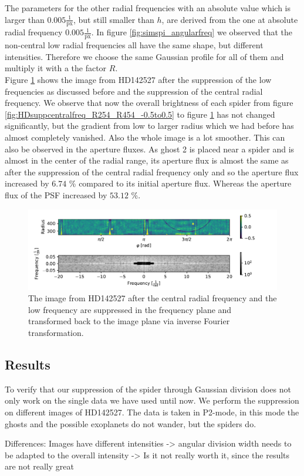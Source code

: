 The parameters for the other radial frequencies with an absolute value which is larger than $0.005 \frac{1}{\mathrm{px}}$, but still smaller than $h$, are derived from the one at absolute radial frequency $0.005 \frac{1}{\mathrm{px}}$. In figure \ref{fig:simspi_angularfreq} we observed that the non-central low radial frequencies all have the same shape, but different intensities. Therefore we choose the same Gaussian profile for all of them and multiply it with a the factor $R$.\\
Figure \ref{fig:HDsupplowfreq_R254_R454_-0.5to0.5.pdf} shows the image from HD142527 after the suppression of the low frequencies as discussed before and the suppression of the central radial frequency. We observe that now the overall brightness of each spider from figure \ref{fig:HDsuppcentralfreq_R254_R454_-0.5to0.5} to figure \ref{fig:HDsupplowfreq_R254_R454_-0.5to0.5.pdf} has not changed significantly, but the gradient from low to larger radius which we had before has almost completely vanished. Also the whole image is a lot smoother. This can also be observed in the aperture fluxes. As ghost 2 is placed near a spider and is almost in the center of the radial range, its aperture flux is almost the same as after the suppression of the central radial frequency only and so the aperture flux increased by $6.74$ \% compared to its initial aperture flux. Whereas the aperture flux of the PSF increased by $53.12$ \%. 
\begin{figure}[H]
	\centering
		\includegraphics[width=1.1\textwidth]{pics/HDsupplowfreq_R254_R454_-0.5to0.5.pdf}
		\caption{The image from HD142527 after the central radial frequency and the low frequency are suppressed in the frequency plane and transformed back to the image plane via inverse Fourier transformation.}
		\label{fig:HDsupplowfreq_R254_R454_-0.5to0.5.pdf}
\end{figure}

\subsection{Results}
To verify that our suppression of the spider through Gaussian division does not only work on the single data we have used until now. We perform the suppression on different images of HD142527. The data is taken in P2-mode, in this mode the ghosts and the possible exoplanets do not wander, but the spiders do. 


Differences: Images have different intensities -> angular division width needs to be adapted to the overall intensity -> Is it not really worth it, since the results are not really great
